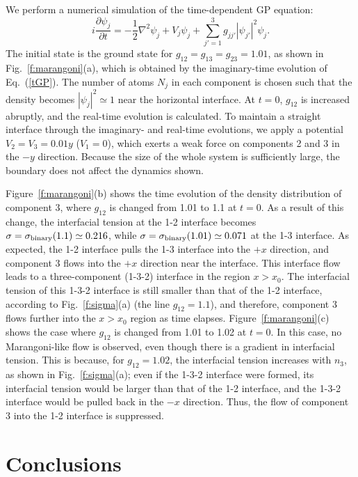 \documentclass[pra,aps,superscriptaddress,twocolumn,color]{revtex4-1}
\begin{document}
We perform a numerical simulation of the time-dependent GP equation:
\begin{equation} \label{tGP}
i \frac{\partial\psi_j}{\partial t} = -\frac{1}{2} \nabla^2 \psi_j + V_j
\psi_j + \sum_{j'=1}^3 g_{jj'} |\psi_{j'}|^2 \psi_j.
\end{equation}
The initial state is the ground state for $g_{12} = g_{13} = g_{23} = 1.01$,
as shown in Fig.~\ref{f:marangoni}(a), which is obtained by the
imaginary-time evolution of Eq.~(\ref{tGP}).
The number of atoms $N_j$ in each component is chosen such that the density
becomes $|\psi_j|^2 \simeq 1$ near the horizontal interface.
At $t = 0$, $g_{12}$ is increased abruptly, and the real-time evolution is
calculated.
To maintain a straight interface through the imaginary- and real-time
evolutions, we apply a potential $V_2 = V_3 = 0.01 y$ ($V_1 = 0$), which
exerts a weak force on components 2 and 3 in the $-y$ direction.
Because the size of the whole system is sufficiently large, the boundary
does not affect the dynamics shown.

Figure~\ref{f:marangoni}(b) shows the time evolution of the density
distribution of component 3, where $g_{12}$ is changed from 1.01 to 1.1 at
$t = 0$.
As a result of this change, the interfacial tension at the 1-2 interface
becomes $\sigma = \sigma_{\rm binary}(1.1) \simeq 0.216$, while $\sigma =
\sigma_{\rm binary}(1.01) \simeq 0.071$ at the 1-3 interface.
As expected, the 1-2 interface pulls the 1-3 interface into the $+x$
direction, and component 3 flows into the $+x$ direction near the interface.
This interface flow leads to a three-component (1-3-2) interface in the
region $x > x_0$.
The interfacial tension of this 1-3-2 interface is still smaller than that
of the 1-2 interface, according to Fig.~\ref{f:sigma}(a) (the line 
$g_{12} = 1.1$), and therefore, component 3 flows further into the $x > x_0$
region as time elapses.
Figure~\ref{f:marangoni}(c) shows the case where $g_{12}$ is changed from
1.01 to 1.02 at $t = 0$.
In this case, no Marangoni-like flow is observed, even though there is a
gradient in interfacial tension.
This is because, for $g_{12} = 1.02$, the interfacial tension increases with
$n_3$, as shown in Fig.~\ref{f:sigma}(a);
even if the 1-3-2 interface were formed, its interfacial tension would be
larger than that of the 1-2 interface, and the 1-3-2 interface would be
pulled back in the $-x$ direction.
Thus, the flow of component 3 into the 1-2 interface is suppressed.


\section{Conclusions}
\label{s:conc}
\end{document}

